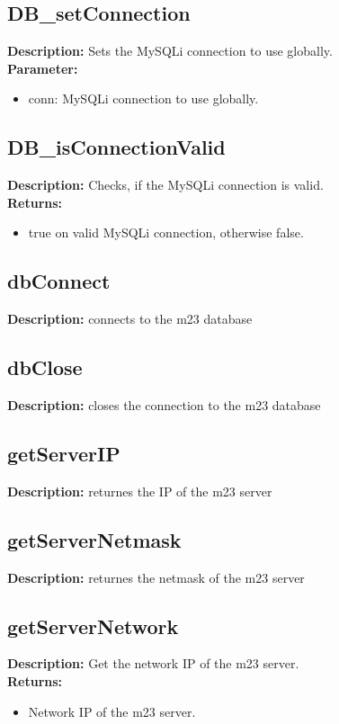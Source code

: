 \subsection{DB\_setConnection}
\textbf{Description:} Sets the MySQLi connection to use globally.\\
\textbf{Parameter:}
\begin{itemize}
\item conn: MySQLi connection to use globally.
\end{itemize}

\subsection{DB\_isConnectionValid}
\textbf{Description:} Checks, if the MySQLi connection is valid.\\
\textbf{Returns:}
\begin{itemize}
\item true on valid MySQLi connection, otherwise false.
\end{itemize}

\subsection{dbConnect}
\textbf{Description:} connects to the m23 database\\

\subsection{dbClose}
\textbf{Description:} closes the connection to the m23 database\\

\subsection{getServerIP}
\textbf{Description:} returnes the IP of the m23 server\\

\subsection{getServerNetmask}
\textbf{Description:} returnes the netmask of the m23 server\\

\subsection{getServerNetwork}
\textbf{Description:} Get the network IP of the m23 server.\\
\textbf{Returns:}
\begin{itemize}
\item Network IP of the m23 server.
\end{itemize}

